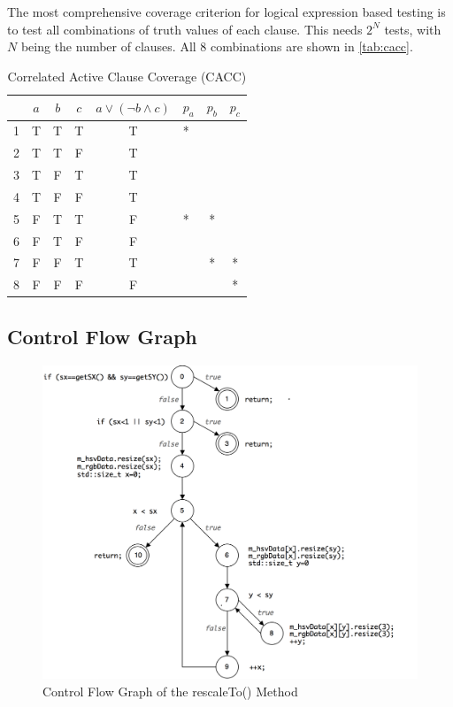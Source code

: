 \documentclass{scrreprt}
\begin{document}
The most comprehensive coverage criterion for logical expression based testing is to test all combinations of truth values of each clause. This needs $2^N$ tests, with $N$ being the number of clauses. All 8 combinations are shown in \vref{tab:cacc}. 

\begin{table}[h]
	\centering
	\caption{\label{tab:cacc}Correlated Active Clause Coverage (CACC)}
	\begin{tabular}{r|ccc|c|l|c|c}
		   & $a$ & $b$ & $c$ & $a \lor (\lnot b \land c)$ & $p_a$ & $p_b$ & $p_c$ \\ \hline
		1 & T & T & T & T & *\quad\quad  &   &  \\
		2 & T & T & F & T & \quad*\quad  &   &  \\
		3 & T & F & T & T & \quad\quad*  &   &  \\
		4 & T & F & F & T &        &   &  \\
		5 & F & T & T & F & *\quad\quad  & * &  \\
		6 & F & T & F & F & \quad*\quad &   &  \\
		7 & F & F & T & T &        & * & *  \\
		8 & F & F & F & F & \quad\quad* &   & *  \\
	\end{tabular}
\end{table}

\subsection{Control Flow Graph}

\begin{figure}[h]
	\centering
	\includegraphics[width=1.0\textwidth]{img/cfg_rescale_to}
	\caption[Control Flow Graph rescaleTo()]{Control Flow Graph of the rescaleTo() Method}
	\label{fig:cfg_rescale_to}
\end{figure}
\end{document}
